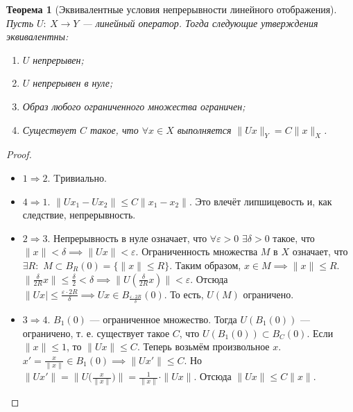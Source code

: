 \documentclass[11pt,openany,a4paper]{scrartcl}
\theoremstyle{plain}
\newtheorem{theorem}{Теорема}[section]
\theoremstyle{definition}
\begin{document}
\begin{theorem}[Эквивалентные условия непрерывности линейного отображения]
    Пусть $U:~X \to Y$ — линейный оператор. Тогда следующие утверждения
    эквивалентны:
    \begin{enumerate}
        \item $U$ непрерывен;
        \item $U$ непрерывен в нуле;
        \item Образ любого ограниченного множества ограничен;
        \item Существует $C$ такое, что $\forall x\in X$
        выполняется $\|Ux\|_Y = C\|x\|_X$.
    \end{enumerate}
\end{theorem}
\begin{proof}
\mbox{}
    \begin{itemize}
        \item $1 \Rightarrow 2$. Tривиально.
        \item $4 \Rightarrow 1$. $\|Ux_1 - Ux_2\| \leqslant
        C\|x_1 - x_2\|$. Это влечёт липшицевость и, как следствие, непрерывность.
        \item $2 \Rightarrow 3$. Непрерывность в нуле означает, что
        $\forall \varepsilon > 0$ $\exists \delta > 0$ такое, что
        $\|x\|<\delta \implies \|Ux\|<\varepsilon$. Ограниченность множества $M$ в $X$
        означает, что $\exists R:$ $M \subset B_R(0)=\{\|x\|\leqslant R\}$.
        Таким образом, $x\in M \implies \|x\| \leqslant R$.
        $\|\frac{\delta}{2R}x\| \leqslant \frac{\delta}{2} < \delta \implies
        \|U(\frac{\delta}{2R}x)\| < \varepsilon$. Отсюда
        $\|Ux| \leqslant \frac{\varepsilon\cdot 2R}{\delta} \implies Ux
        \in B_{\frac{\varepsilon\cdot 2R}{\delta}}(0)$. То есть, $U(M)$ ограничено.
        \item $3 \Rightarrow 4$. $B_1(0)$ — ограниченное множество. Тогда
        $U(B_1(0))$ — ограничено, т. е. существует такое $C$, что
        $U(B_1(0)) \subset B_C(0)$. Если $\|x\|\leqslant 1$, то $\|Ux\| \leqslant C$.
        Теперь возьмём произвольное $x$. $x' = \frac{x}{\|x\|} \in B_1(0) \implies
        \|Ux'\| \leqslant C$. Но $\|Ux'\| = \|U\big(\frac{x}{\|x\|}\big)\| =
        \frac{1}{\|x\|} \cdot \|Ux\|$. Отсюда $\|Ux\|\leqslant C\|x\|$.
    \end{itemize} 
\end{proof}
\end{document}
